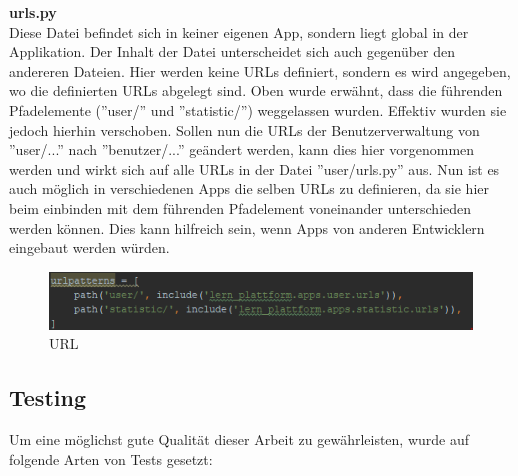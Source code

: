 \textbf{urls.py} \\
Diese Datei befindet sich in keiner eigenen App, sondern liegt global in der Applikation. Der Inhalt der Datei unterscheidet sich auch gegenüber den andereren Dateien. Hier werden keine URLs definiert, sondern es wird angegeben, wo die definierten URLs abgelegt sind. Oben wurde erwähnt, dass die führenden Pfadelemente (''user/'' und ''statistic/'') weggelassen wurden. Effektiv wurden sie jedoch hierhin verschoben. Sollen nun die URLs der Benutzerverwaltung von ''user/...'' nach ''benutzer/...'' geändert werden, kann dies hier vorgenommen werden und wirkt sich auf alle URLs in der Datei ''user/urls.py'' aus. Nun ist es auch möglich in verschiedenen Apps die selben URLs zu definieren, da sie hier beim einbinden mit dem führenden Pfadelement voneinander unterschieden werden können. Dies kann hilfreich sein, wenn Apps von anderen Entwicklern eingebaut werden würden. \\
\begin{minipage}{\textwidth}
	\begin{figure}[H]
		\includegraphics[width=\textwidth, height=\textheight, keepaspectratio]{images/URLglobal.png}
		\caption{URL}
	\end{figure}
\end{minipage}



\subsection{Testing}

Um eine möglichst gute Qualität dieser Arbeit zu gewährleisten, wurde auf folgende Arten von Tests gesetzt:

